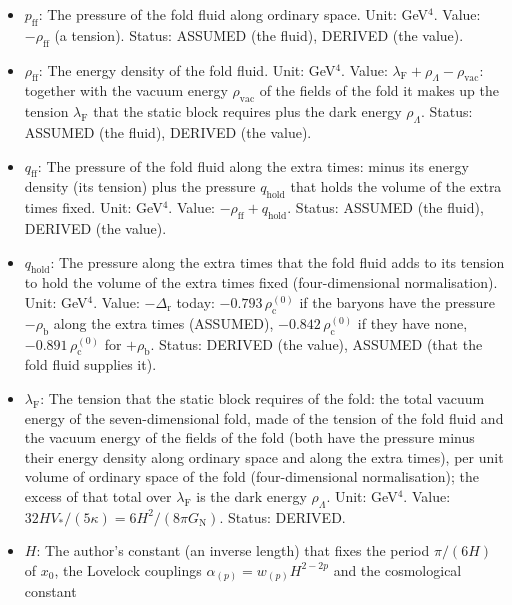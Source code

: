 \documentclass[
  10pt,
]{article}
\providecommand{\tightlist}{%
  \setlength{\itemsep}{0pt}\setlength{\parskip}{0pt}}
\begin{document}
\begin{itemize}
\tightlist
\item
  \(p_{\mathrm{ff}}\): The pressure of the fold fluid along ordinary
  space. Unit: GeV\(^4\). Value: \(-\rho_{\mathrm{ff}}\) (a tension).
  Status: ASSUMED (the fluid), DERIVED (the value).
\item
  \(\rho_{\mathrm{ff}}\): The energy density of the fold fluid. Unit:
  GeV\(^4\). Value:
  \(\lambda_{\mathrm{F}} + \rho_\Lambda - \rho_{\mathrm{vac}}\):
  together with the vacuum energy \(\rho_{\mathrm{vac}}\) of the fields
  of the fold it makes up the tension \(\lambda_{\mathrm{F}}\) that the
  static block requires plus the dark energy \(\rho_\Lambda\). Status:
  ASSUMED (the fluid), DERIVED (the value).
\item
  \(q_{\mathrm{ff}}\): The pressure of the fold fluid along the extra
  times: minus its energy density (its tension) plus the pressure
  \(q_{\mathrm{hold}}\) that holds the volume of the extra times fixed.
  Unit: GeV\(^4\). Value: \(-\rho_{\mathrm{ff}} + q_{\mathrm{hold}}\).
  Status: ASSUMED (the fluid), DERIVED (the value).
\item
  \(q_{\mathrm{hold}}\): The pressure along the extra times that the
  fold fluid adds to its tension to hold the volume of the extra times
  fixed (four-dimensional normalisation). Unit: GeV\(^4\). Value:
  \(-\Delta_{\mathrm{r}}\) today: \(-0.793\,\rho_{\mathrm{c}}^{(0)}\) if
  the baryons have the pressure \(-\rho_{\mathrm{b}}\) along the extra
  times (ASSUMED), \(-0.842\,\rho_{\mathrm{c}}^{(0)}\) if they have
  none, \(-0.891\,\rho_{\mathrm{c}}^{(0)}\) for \(+\rho_{\mathrm{b}}\).
  Status: DERIVED (the value), ASSUMED (that the fold fluid supplies
  it).
\item
  \(\lambda_{\mathrm{F}}\): The tension that the static block requires
  of the fold: the total vacuum energy of the seven-dimensional fold,
  made of the tension of the fold fluid and the vacuum energy of the
  fields of the fold (both have the pressure minus their energy density
  along ordinary space and along the extra times), per unit volume of
  ordinary space of the fold (four-dimensional normalisation); the
  excess of that total over \(\lambda_{\mathrm{F}}\) is the dark energy
  \(\rho_\Lambda\). Unit: GeV\(^4\). Value:
  \(32HV_*/(5\kappa) = 6H^2/(8\pi G_{\mathrm{N}})\). Status: DERIVED.
\item
  \(H\): The author's constant (an inverse length) that fixes the period
  \(\pi/(6H)\) of \(x_0\), the Lovelock couplings
  \(\alpha_{(p)} = w_{(p)}H^{2-2p}\) and the cosmological constant

\end{itemize}
\end{document}
